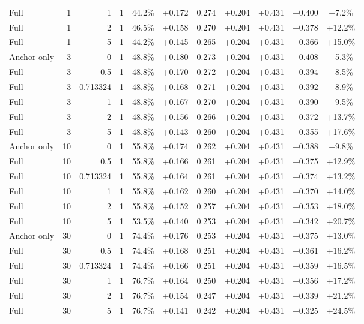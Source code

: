 \begin{table}[htbp]
\begin{tabular}{lrrrccccccc}
Full & 1 & 1 & 1 & 44.2\% & +0.172 & 0.274 & +0.204 & +0.431 & +0.400 & +7.2\% \\
Full & 1 & 2 & 1 & 46.5\% & +0.158 & 0.270 & +0.204 & +0.431 & +0.378 & +12.2\% \\
Full & 1 & 5 & 1 & 44.2\% & +0.145 & 0.265 & +0.204 & +0.431 & +0.366 & +15.0\% \\
Anchor only & 3 & 0 & 1 & 48.8\% & +0.180 & 0.273 & +0.204 & +0.431 & +0.408 & +5.3\% \\
Full & 3 & 0.5 & 1 & 48.8\% & +0.170 & 0.272 & +0.204 & +0.431 & +0.394 & +8.5\% \\
Full & 3 & 0.713324 & 1 & 48.8\% & +0.168 & 0.271 & +0.204 & +0.431 & +0.392 & +8.9\% \\
Full & 3 & 1 & 1 & 48.8\% & +0.167 & 0.270 & +0.204 & +0.431 & +0.390 & +9.5\% \\
Full & 3 & 2 & 1 & 48.8\% & +0.156 & 0.266 & +0.204 & +0.431 & +0.372 & +13.7\% \\
Full & 3 & 5 & 1 & 48.8\% & +0.143 & 0.260 & +0.204 & +0.431 & +0.355 & +17.6\% \\
Anchor only & 10 & 0 & 1 & 55.8\% & +0.174 & 0.262 & +0.204 & +0.431 & +0.388 & +9.8\% \\
Full & 10 & 0.5 & 1 & 55.8\% & +0.166 & 0.261 & +0.204 & +0.431 & +0.375 & +12.9\% \\
Full & 10 & 0.713324 & 1 & 55.8\% & +0.164 & 0.261 & +0.204 & +0.431 & +0.374 & +13.2\% \\
Full & 10 & 1 & 1 & 55.8\% & +0.162 & 0.260 & +0.204 & +0.431 & +0.370 & +14.0\% \\
Full & 10 & 2 & 1 & 55.8\% & +0.152 & 0.257 & +0.204 & +0.431 & +0.353 & +18.0\% \\
Full & 10 & 5 & 1 & 53.5\% & +0.140 & 0.253 & +0.204 & +0.431 & +0.342 & +20.7\% \\
Anchor only & 30 & 0 & 1 & 74.4\% & +0.176 & 0.253 & +0.204 & +0.431 & +0.375 & +13.0\% \\
Full & 30 & 0.5 & 1 & 74.4\% & +0.168 & 0.251 & +0.204 & +0.431 & +0.361 & +16.2\% \\
Full & 30 & 0.713324 & 1 & 74.4\% & +0.166 & 0.251 & +0.204 & +0.431 & +0.359 & +16.5\% \\
Full & 30 & 1 & 1 & 76.7\% & +0.164 & 0.250 & +0.204 & +0.431 & +0.356 & +17.2\% \\
Full & 30 & 2 & 1 & 76.7\% & +0.154 & 0.247 & +0.204 & +0.431 & +0.339 & +21.2\% \\
Full & 30 & 5 & 1 & 76.7\% & +0.141 & 0.242 & +0.204 & +0.431 & +0.325 & +24.5\% \\

\end{tabular}
\end{table}

